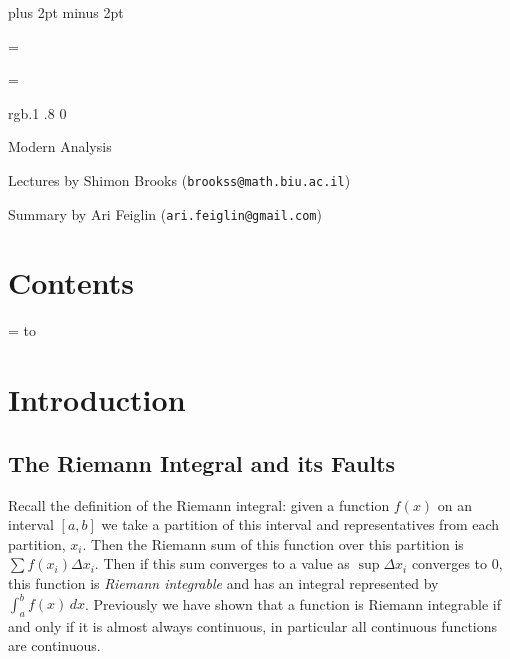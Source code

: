 

\parindent=0pt
\parskip=3pt plus 2pt minus 2pt



\footline={}


\headline={}

\color rgb{.1 .8 0}

{\def\boxshadowcolor{rgb{.5 .8 .5}}

    \centerline{Modern Analysis }
    \smallskip
    \centerline{Lectures by Shimon Brooks ({\tt brookss@math.biu.ac.il})}
    \centerline{Summary by Ari Feiglin ({\tt ari.feiglin@gmail.com})}

\eppbox

\bigskip

    \section*{Contents}
    
    \tableofcontents
\eppbox

}

\vfill\break

\color{black}

\newif\ifpageodd
\pageoddtrue
\headline={%
    \hbox to \hsize{\color{black}%
        \ifpageodd\hfil{\it\currsubsection\quad\bf\folio}\global\pageoddfalse%
        \else{\bf\folio\quad\it\currsubsection}\hfil\global\pageoddtrue\fi%
    }%
}

\section{Introduction}

\subsection*{The Riemann Integral and its Faults}

Recall the definition of the Riemann integral: given a function $f(x)$ on an interval $[a,b]$ we take a partition of this interval and representatives from each partition, $x_i$.
Then the Riemann sum of this function over this partition is $\sum f(x_i)\Delta x_i$.
Then if this sum converges to a value as $\sup\Delta x_i$ converges to $0$, this function is {\it Riemann integrable} and has an integral represented by $\int_a^b f(x)\,dx$.
Previously we have shown that a function is Riemann integrable if and only if it is almost always continuous, in particular all continuous functions are continuous.

